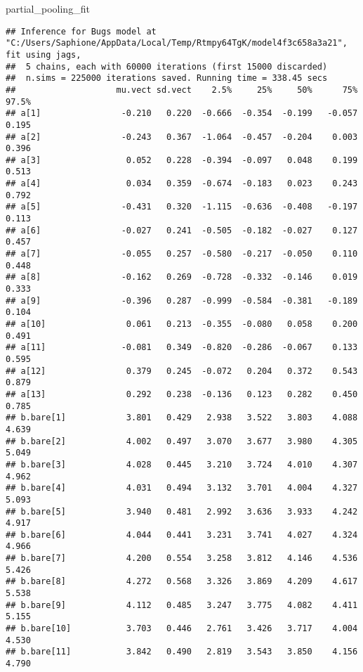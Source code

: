 \documentclass[
]{article}
\newenvironment{Shaded}{\begin{snugshade}}{\end{snugshade}}
\newcommand{\NormalTok}[1]{#1}
\begin{document}
\begin{Shaded}
\begin{Highlighting}[]
\NormalTok{partial\_pooling\_fit}
\end{Highlighting}
\end{Shaded}

\begin{verbatim}
## Inference for Bugs model at "C:/Users/Saphione/AppData/Local/Temp/Rtmpy64TgK/model4f3c658a3a21", fit using jags,
##  5 chains, each with 60000 iterations (first 15000 discarded)
##  n.sims = 225000 iterations saved. Running time = 338.45 secs
##                    mu.vect sd.vect    2.5%     25%     50%      75%    97.5%
## a[1]                -0.210   0.220  -0.666  -0.354  -0.199   -0.057    0.195
## a[2]                -0.243   0.367  -1.064  -0.457  -0.204    0.003    0.396
## a[3]                 0.052   0.228  -0.394  -0.097   0.048    0.199    0.513
## a[4]                 0.034   0.359  -0.674  -0.183   0.023    0.243    0.792
## a[5]                -0.431   0.320  -1.115  -0.636  -0.408   -0.197    0.113
## a[6]                -0.027   0.241  -0.505  -0.182  -0.027    0.127    0.457
## a[7]                -0.055   0.257  -0.580  -0.217  -0.050    0.110    0.448
## a[8]                -0.162   0.269  -0.728  -0.332  -0.146    0.019    0.333
## a[9]                -0.396   0.287  -0.999  -0.584  -0.381   -0.189    0.104
## a[10]                0.061   0.213  -0.355  -0.080   0.058    0.200    0.491
## a[11]               -0.081   0.349  -0.820  -0.286  -0.067    0.133    0.595
## a[12]                0.379   0.245  -0.072   0.204   0.372    0.543    0.879
## a[13]                0.292   0.238  -0.136   0.123   0.282    0.450    0.785
## b.bare[1]            3.801   0.429   2.938   3.522   3.803    4.088    4.639
## b.bare[2]            4.002   0.497   3.070   3.677   3.980    4.305    5.049
## b.bare[3]            4.028   0.445   3.210   3.724   4.010    4.307    4.962
## b.bare[4]            4.031   0.494   3.132   3.701   4.004    4.327    5.093
## b.bare[5]            3.940   0.481   2.992   3.636   3.933    4.242    4.917
## b.bare[6]            4.044   0.441   3.231   3.741   4.027    4.324    4.966
## b.bare[7]            4.200   0.554   3.258   3.812   4.146    4.536    5.426
## b.bare[8]            4.272   0.568   3.326   3.869   4.209    4.617    5.538
## b.bare[9]            4.112   0.485   3.247   3.775   4.082    4.411    5.155
## b.bare[10]           3.703   0.446   2.761   3.426   3.717    4.004    4.530
## b.bare[11]           3.842   0.490   2.819   3.543   3.850    4.156    4.790

\end{verbatim}
\end{document}
